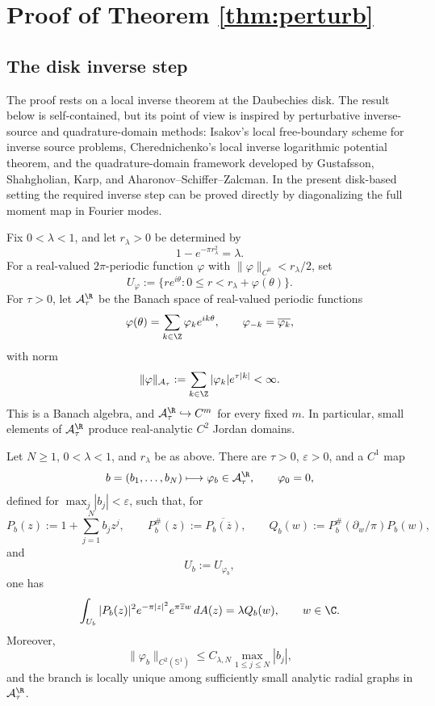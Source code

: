 \section{Proof of Theorem \ref{thm:perturb}}\label{sec:perturb-proof}

\subsection{The disk inverse step}\label{subsec:disk-inverse-step}

The proof rests on a local inverse theorem at the Daubechies disk. The result
below is self-contained, but its point of view is inspired by perturbative
inverse-source and quadrature-domain methods: Isakov's local free-boundary
scheme for inverse source problems, Cherednichenko's local inverse logarithmic
potential theorem, and the quadrature-domain framework developed by
Gustafsson, Shahgholian, Karp, and Aharonov--Schiffer--Zalcman. In the present
disk-based setting the required inverse step can be proved directly by
diagonalizing the full moment map in Fourier modes.

Fix \(0<\lambda<1\), and let \(r_\lambda>0\) be determined by
\[
1-e^{-\pi r_\lambda^2}=\lambda .
\]
For a real-valued \(2\pi\)-periodic function \(\varphi\) with
\(\|\varphi\|_{C^0}<r_\lambda/2\), set
\[
U_\varphi
:=
\{re^{i\theta}:0\le r<r_\lambda+\varphi(\theta)\}.
\]
For \(\tau>0\), let \(\mathcal A_\tau^\R\) be the Banach space of real-valued
periodic functions
\[
\varphi(\theta)=\sum_{k\in\Z}\varphi_k e^{ik\theta},
\qquad
\varphi_{-k}=\overline{\varphi_k},
\]
with norm
\[
\|\varphi\|_{\mathcal A_\tau}
:=
\sum_{k\in\Z}|\varphi_k|e^{\tau |k|}<\infty .
\]
This is a Banach algebra, and \(\mathcal A_\tau^\R\hookrightarrow C^m\) for
every fixed \(m\). In particular, small elements of \(\mathcal A_\tau^\R\)
produce real-analytic \(C^2\) Jordan domains.

\begin{proposition}\label{prop:disk-inverse-tailored}
Let \(N\ge1\), \(0<\lambda<1\), and \(r_\lambda\) be as above. There are
\(\tau>0\), \(\varepsilon>0\), and a \(C^1\) map
\[
b=(b_1,\ldots,b_N)\longmapsto \varphi_b\in\mathcal A_\tau^\R,
\qquad
\varphi_0=0,
\]
defined for \(\max_j|b_j|<\varepsilon\), such that, for
\[
P_b(z):=1+\sum_{j=1}^N b_jz^j,
\qquad
P_b^\#(z):=\overline{P_b(\overline z)},
\qquad
Q_b(w):=P_b^\#(\partial_w/\pi)P_b(w),
\]
and
\[
U_b:=U_{\varphi_b},
\]
one has
\begin{equation}\label{eq:disk-inverse-identity}
\int_{U_b}|P_b(z)|^2e^{-\pi |z|^2}e^{\pi\overline z w}\,dA(z)
=
\lambda Q_b(w),
\qquad w\in\C .
\end{equation}
Moreover,
\[
\|\varphi_b\|_{C^2(\mathbb S^1)}
\le C_{\lambda,N}\max_{1\le j\le N}|b_j|,
\]
and the branch is locally unique among sufficiently small analytic radial
graphs in \(\mathcal A_\tau^\R\).
\end{proposition}

